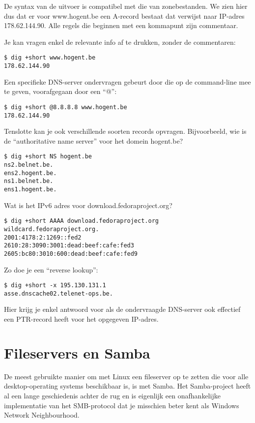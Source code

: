 De syntax van de uitvoer is compatibel met die van zonebestanden. We zien hier dus dat er voor www.hogent.be een A-record bestaat dat verwijst naar IP-adres 178.62.144.90. Alle regels die beginnen met een kommapunt zijn commentaar.

Je kan vragen enkel de relevante info af te drukken, zonder de commentaren:

\begin{verbatim}
$ dig +short www.hogent.be
178.62.144.90
\end{verbatim}

Een specifieke DNS-server ondervragen gebeurt door die op de command-line mee te geven, voorafgegaan door een ``@'':

\begin{verbatim}
$ dig +short @8.8.8.8 www.hogent.be
178.62.144.90
\end{verbatim}

Tenslotte kan je ook verschillende soorten records opvragen. Bijvoorbeeld, wie is de ``authoritative name server'' voor het domein hogent.be?

\begin{verbatim}
$ dig +short NS hogent.be
ns2.belnet.be.
ens2.hogent.be.
ns1.belnet.be.
ens1.hogent.be.
\end{verbatim}

Wat is het IPv6 adres voor download.fedoraproject.org?

\begin{verbatim}
$ dig +short AAAA download.fedoraproject.org
wildcard.fedoraproject.org.
2001:4178:2:1269::fed2
2610:28:3090:3001:dead:beef:cafe:fed3
2605:bc80:3010:600:dead:beef:cafe:fed9
\end{verbatim}

Zo doe je een ``reverse lookup'':

\begin{verbatim}
$ dig +short -x 195.130.131.1
asse.dnscache02.telenet-ops.be.
\end{verbatim}

Hier krijg je enkel antwoord voor als de ondervraagde DNS-server ook effectief een PTR-record heeft voor het opgegeven IP-adres.

\section{Fileservers en Samba}%
\label{sec:fileservers-en-samba}

De meest gebruikte manier om met Linux een fileserver op te zetten die voor alle desktop-operating systems beschikbaar is, is met Samba. Het Samba-project heeft al een lange geschiedenis achter de rug en is eigenlijk een onafhankelijke implementatie van het SMB-protocol dat je misschien beter kent als Windows Network Neighbourhood.


